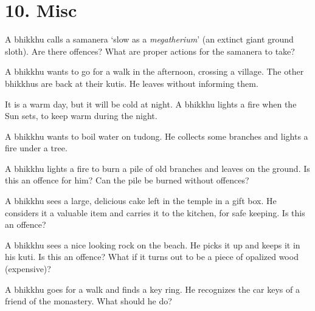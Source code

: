 \chapter{10. Misc}
\renewcommand*{\theChapterTitle}{10. Misc}

A bhikkhu calls a samanera `slow as a \emph{megatherium}' (an extinct giant ground sloth).
Are there offences?
What are proper actions for the samanera to take?

\bigskip

A bhikkhu wants to go for a walk in the afternoon, crossing a village. The other bhikkhus are back at their kutis.
He leaves without informing them.

\bigskip

It is a warm day, but it will be cold at night. A bhikkhu lights a fire when the Sun sets, to keep warm during the night.

\bigskip

A bhikkhu wants to boil water on tudong. He collects some branches and lights a fire under a tree.

\bigskip

A bhikkhu lights a fire to burn a pile of old branches and leaves on the ground.
Is this an offence for him?
Can the pile be burned without offences?

\bigskip

A bhikkhu sees a large, delicious cake left in the temple in a gift box.
He considers it a valuable item and carries it to the kitchen, for safe keeping.
Is this an offence?

\bigskip

A bhikkhu sees a nice looking rock on the beach.
He picks it up and keeps it in his kuti.
Is this an offence?
What if it turns out to be a piece of opalized wood (expensive)?

\bigskip

A bhikkhu goes for a walk and finds a key ring.
He recognizes the car keys of a friend of the monastery.
What should he do?

